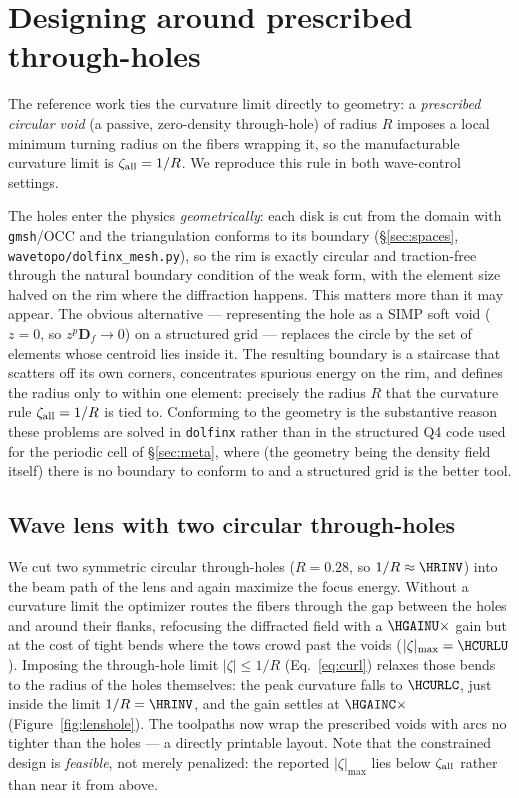 \documentclass[11pt]{article}
\begin{document}
\section{Designing around prescribed through-holes}
\label{sec:hole}
The reference work ties the curvature limit directly to geometry: a
\emph{prescribed circular void} (a passive, zero-density through-hole) of radius
$R$ imposes a local minimum turning radius on the fibers wrapping it, so the
manufacturable curvature limit is $\zeta_{\rm all}=1/R$. We reproduce this rule in
both wave-control settings.

The holes enter the physics \emph{geometrically}: each disk is cut from the domain
with \texttt{gmsh}/OCC and the triangulation conforms to its boundary
(\S\ref{sec:spaces}, \texttt{wavetopo/dolfinx\_mesh.py}), so the rim is exactly
circular and traction-free through the natural boundary condition of the weak
form, with the element size halved on the rim where the diffraction happens. This
matters more than it may appear. The obvious alternative --- representing the hole
as a SIMP soft void ($z=0$, so $z^p\mathbf D_f\to0$) on a structured grid ---
replaces the circle by the set of elements whose centroid lies inside it. The
resulting boundary is a staircase that scatters off its own corners, concentrates
spurious energy on the rim, and defines the radius only to within one element:
precisely the radius $R$ that the curvature rule $\zeta_{\rm all}=1/R$ is tied to.
Conforming to the geometry is the substantive reason these problems are solved in
\texttt{dolfinx} rather than in the structured Q4 code used for the periodic cell
of \S\ref{sec:meta}, where (the geometry being the density field itself) there is
no boundary to conform to and a structured grid is the better tool.

\subsection{Wave lens with two circular through-holes}
\label{sec:lenshole}
We cut two symmetric circular through-holes ($R=0.28$, so $1/R\approx\HRINV$)
into the beam path of the lens and again maximize the focus energy. Without a
curvature limit the optimizer routes the fibers through the gap between the holes
and around their flanks, refocusing the diffracted field with a
$\HGAINU\times$ gain but at the cost of tight bends where the tows crowd past the
voids ($|\zeta|_{\max}=\HCURLU$). Imposing the through-hole limit
$|\zeta|\le1/R$ (Eq.~\eqref{eq:curl}) relaxes those bends to the radius of the
holes themselves: the peak curvature falls to $\HCURLC$, just inside the limit
$1/R=\HRINV$, and the gain settles at $\HGAINC\times$
(Figure~\ref{fig:lenshole}). The toolpaths now wrap the prescribed voids with arcs
no tighter than the holes --- a directly printable layout. Note that the
constrained design is \emph{feasible}, not merely penalized: the reported
$|\zeta|_{\max}$ lies below $\zeta_{\rm all}$ rather than near it from above.
\end{document}
